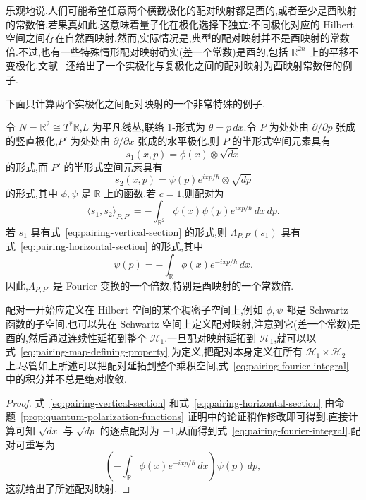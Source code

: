 乐观地说,人们可能希望任意两个横截极化的配对映射都是酉的,或者至少是酉映射的常数倍.若果真如此,这意味着量子化在极化选择下独立:不同极化对应的 Hilbert 空间之间存在自然酉映射.然而,实际情况是,典型的配对映射并不是酉映射的常数倍.不过,也有一些特殊情形配对映射确实(差一个常数)是酉的,包括 $\mathbb R^{2n}$ 上的平移不变极化.文献~\cite{Hall2002} 还给出了一个实极化与复极化之间的配对映射为酉映射常数倍的例子.

下面只计算两个实极化之间配对映射的一个非常特殊的例子.

\begin{example}[位置与动量极化之间的配对映射]
\label{ex:pairing-position-momentum}
令 $N=\mathbb R^2\cong T^*\mathbb R$,$L$ 为平凡线丛,联络 1-形式为 $\theta=p\,dx$.令 $P$ 为处处由 $\partial/\partial p$ 张成的竖直极化,$P'$ 为处处由 $\partial/\partial x$ 张成的水平极化.则 $P$ 的半形式空间元素具有
\[
 s_1(x,p)=\phi(x)\otimes\sqrt{dx}
 \label{eq:pairing-vertical-section}
\]
的形式,而 $P'$ 的半形式空间元素具有
\[
 s_2(x,p)=\psi(p)e^{ixp/\hbar}\otimes\sqrt{dp}
 \label{eq:pairing-horizontal-section}
\]
的形式,其中 $\phi,\psi$ 是 $\mathbb R$ 上的函数.若 $c=1$,则配对为
\[
 \langle s_1,s_2\rangle_{P,P'}
 =-\int_{\mathbb R^2}\phi(x)\psi(p)e^{ixp/\hbar}\,dx\,dp.
 \label{eq:pairing-fourier-integral}
\]
若 $s_1$ 具有式~\eqref{eq:pairing-vertical-section} 的形式,则 $\Lambda_{P,P'}(s_1)$ 具有式~\eqref{eq:pairing-horizontal-section} 的形式,其中
\[
 \psi(p)=-\int_{\mathbb R}\phi(x)e^{-ixp/\hbar}\,dx.
\]
因此,$\Lambda_{P,P'}$ 是 Fourier 变换的一个倍数,特别是酉映射的一个常数倍.
\end{example}

配对一开始应定义在 Hilbert 空间的某个稠密子空间上,例如 $\phi,\psi$ 都是 Schwartz 函数的子空间.也可以先在 Schwartz 空间上定义配对映射,注意到它(差一个常数)是酉的,然后通过连续性延拓到整个 $\mathcal H_1$.一旦配对映射延拓到 $\mathcal H_1$,就可以以式~\eqref{eq:pairing-map-defining-property} 为定义,把配对本身定义在所有 $\mathcal H_1\times\mathcal H_2$ 上.尽管如上所述可以把配对延拓到整个乘积空间,式~\eqref{eq:pairing-fourier-integral} 中的积分并不总是绝对收敛.

\begin{proof}
式~\eqref{eq:pairing-vertical-section} 和式~\eqref{eq:pairing-horizontal-section} 由命题~\ref{prop:quantum-polarization-functions} 证明中的论证稍作修改即可得到.直接计算可知 $\sqrt{dx}$ 与 $\sqrt{dp}$ 的逐点配对为 $-1$,从而得到式~\eqref{eq:pairing-fourier-integral}.配对可重写为
\[
 \left(-\int_{\mathbb R}\phi(x)e^{-ixp/\hbar}\,dx\right)\psi(p)\,dp,
\]
这就给出了所述配对映射.
\end{proof}

\chaptertwentythreeexercises
